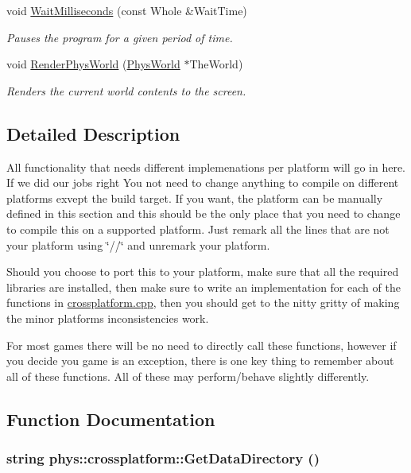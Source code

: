 \begin{DoxyCompactItemize}
void \hyperlink{namespacephys_1_1crossplatform_ab5287fc10a132457a1309e1f5645347a}{WaitMilliseconds} (const Whole \&WaitTime)
\begin{DoxyCompactList}\small\item\em Pauses the program for a given period of time. \item\end{DoxyCompactList}\item 
void \hyperlink{namespacephys_1_1crossplatform_a2025b17e592096a6fbb6d24619138c71}{RenderPhysWorld} (\hyperlink{classPhysWorld}{PhysWorld} $\ast$TheWorld)
\begin{DoxyCompactList}\small\item\em Renders the current world contents to the screen. \item\end{DoxyCompactList}\end{DoxyCompactItemize}


\subsection{Detailed Description}
All functionality that needs different implemenations per platform will go in here. If we did our jobs right You not need to change anything to compile on different platforms exvept the build target. If you want, the platform can be manually defined in this section and this should be the only place that you need to change to compile this on a supported platform. Just remark all the lines that are not your platform using \char`\"{}//\char`\"{} and unremark your platform. \par
\par
 Should you choose to port this to your platform, make sure that all the required libraries are installed, then make sure to write an implementation for each of the functions in \hyperlink{crossplatform_8cpp_source}{crossplatform.cpp}, then you should get to the nitty gritty of making the minor platforms inconsistencies work. \par
\par
 For most games there will be no need to directly call these functions, however if you decide you game is an exception, there is one key thing to remember about all of these functions. All of these may perform/behave slightly differently. 

\subsection{Function Documentation}
\hypertarget{namespacephys_1_1crossplatform_ac73c7f2db76ddfeb41723d72decc1366}{
\subsubsection[{GetDataDirectory}]{\setlength{\rightskip}{0pt plus 5cm}string phys::crossplatform::GetDataDirectory ()}}
\label{d4/d59/namespacephys_1_1crossplatform_ac73c7f2db76ddfeb41723d72decc1366}


